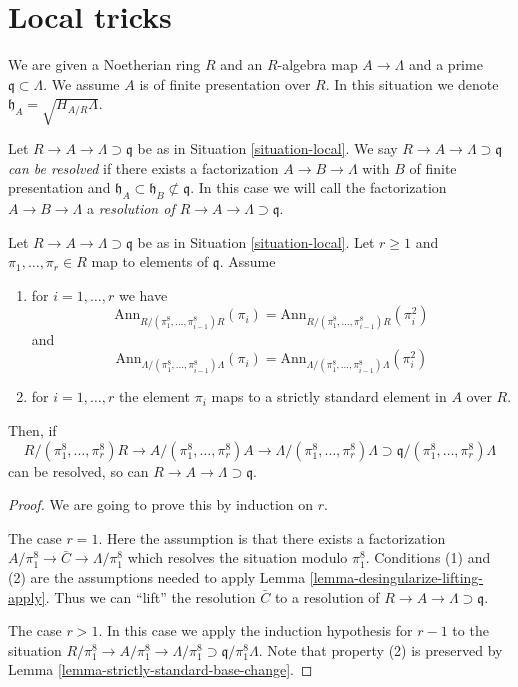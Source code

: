 \section{Local tricks}
\label{section-local}


\begin{situation}
\label{situation-local}
We are given a Noetherian ring $R$ and an $R$-algebra map $A \to \Lambda$
and a prime $\mathfrak q \subset \Lambda$. We assume $A$ is of
finite presentation over $R$. In this situation we denote
$\mathfrak h_A = \sqrt{H_{A/R} \Lambda}$.
\end{situation}

\noindent
Let $R \to A \to \Lambda \supset \mathfrak q$ be as in
Situation \ref{situation-local}. We say
{\it $R \to A \to \Lambda \supset \mathfrak q$
can be resolved} if there exists a factorization $A \to B \to \Lambda$
with $B$ of finite presentation and
$\mathfrak h_A \subset \mathfrak h_B \not \subset \mathfrak q$.
In this case we will call the factorization $A \to B \to \Lambda$
a {\it resolution of $R \to A \to \Lambda \supset \mathfrak q$}.

\begin{lemma}
\label{lemma-lift-solution}
Let $R \to A \to \Lambda \supset \mathfrak q$ be as in
Situation \ref{situation-local}. Let $r \geq 1$ and
$\pi_1, \ldots, \pi_r \in R$ map to elements of $\mathfrak q$. Assume
\begin{enumerate}
\item for $i = 1, \ldots, r$ we have
$$
\text{Ann}_{R/(\pi_1^8, \ldots, \pi_{i - 1}^8)R}(\pi_i)
=
\text{Ann}_{R/(\pi_1^8, \ldots, \pi_{i - 1}^8)R}(\pi_i^2)
$$
and
$$
\text{Ann}_{\Lambda/(\pi_1^8, \ldots, \pi_{i - 1}^8)\Lambda}(\pi_i)
=
\text{Ann}_{\Lambda/(\pi_1^8, \ldots, \pi_{i - 1}^8)\Lambda}(\pi_i^2)
$$
\item for $i = 1, \ldots, r$ the element $\pi_i$ maps to a strictly
standard element in $A$ over $R$.
\end{enumerate}
Then, if
$$
R/(\pi_1^8, \ldots, \pi_r^8)R \to A/(\pi_1^8, \ldots, \pi_r^8)A
\to \Lambda/(\pi_1^8, \ldots, \pi_r^8)\Lambda \supset
\mathfrak q/(\pi_1^8, \ldots, \pi_r^8)\Lambda
$$
can be resolved, so can $R \to A \to \Lambda \supset \mathfrak q$.
\end{lemma}

\begin{proof}
We are going to prove this by induction on $r$.

\medskip\noindent
The case $r = 1$. Here the assumption is that there exists a
factorization $A/\pi_1^8 \to \bar C \to \Lambda/\pi_1^8$
which resolves the situation modulo $\pi_1^8$. Conditions (1) and
(2) are the assumptions needed to apply
Lemma \ref{lemma-desingularize-lifting-apply}.
Thus we can ``lift'' the resolution $\bar C$
to a resolution of $R \to A \to \Lambda \supset \mathfrak q$.

\medskip\noindent
The case $r > 1$. In this case we apply the induction hypothesis for $r - 1$
to the situation
$R/\pi_1^8 \to A/\pi_1^8 \to \Lambda/\pi_1^8
\supset \mathfrak q/\pi_1^8\Lambda$.
Note that property (2) is preserved by
Lemma \ref{lemma-strictly-standard-base-change}.
\end{proof}

